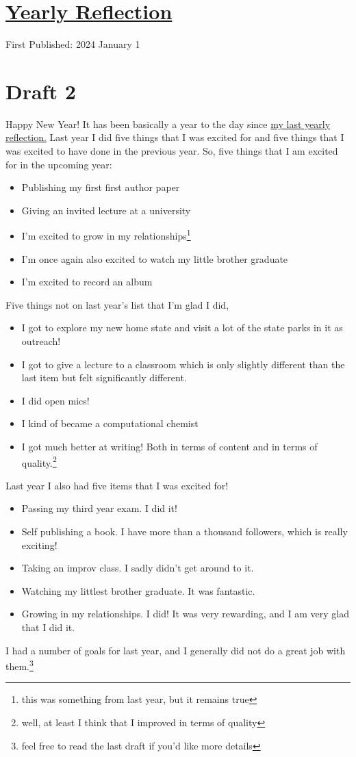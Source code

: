 \documentclass[12pt]{article}[titlepage]
\renewcommand{\,}{\textsuperscript{,}}
\begin{document}
\doublespacing
\section{\href{reflection-2023.html}{Yearly Reflection}}
First Published: 2024 January 1

\section{Draft 2}
Happy New Year!
It has been basically a year to the day since \href{reflection-2022.html}{my last yearly reflection.}
Last year I did five things that I was excited for and five things that I was excited to have done in the previous year.
So, five things that I am excited for in the upcoming year:

\begin{itemize}
\item Publishing my first first author paper
\item Giving an invited lecture at a university
\item I'm excited to grow in my relationships\footnote{this was something from last year, but it remains true}
\item I'm once again also excited to watch my little brother graduate
\item I'm excited to record an album
\end{itemize}
Five things not on last year's list that I'm glad I did,
\begin{itemize}
\item I got to explore my new home state and visit a lot of the state parks in it as outreach!
\item I got to give a lecture to a classroom which is only slightly different than the last item but felt significantly different.
\item I did open mics!
\item I kind of became a computational chemist
\item I got much better at writing! Both in terms of content and in terms of quality.\footnote{well, at least I think that I improved in terms of quality}
\end{itemize}

Last year I also had five items that I was excited for!
\begin{itemize}
\item Passing my third year exam. I did it!
\item Self publishing a book. I have more than a thousand followers, which is really exciting!
\item Taking an improv class. I sadly didn't get around to it.
\item Watching my littlest brother graduate. It was fantastic.
\item Growing in my relationships. I did! It was very rewarding, and I am very glad that I did it.
\end{itemize}
I had a number of goals for last year, and I generally did not do a great job with them.\footnote{feel free to read the last draft if you'd like more details}
\end{document}

